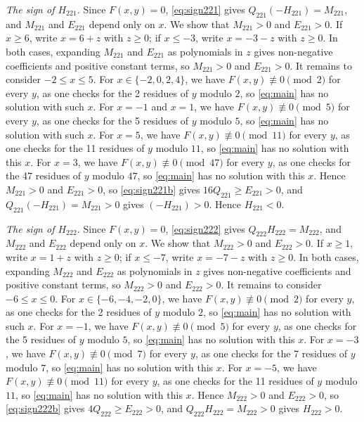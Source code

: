 \documentclass[11pt]{article}
\begin{document}
\emph{The sign of $H_{221}$.} Since $F(x,y)=0$, \eqref{eq:sign221} gives $Q_{221}(-H_{221})=M_{221}$, and $M_{221}$ and $E_{221}$ depend only on $x$. We show that $M_{221}>0$ and $E_{221}>0$. If $x\geq6$, write $x=6+z$ with $z\geq0$; if $x\leq-3$, write $x=-3-z$ with $z\geq0$. In both cases, expanding $M_{221}$ and $E_{221}$ as polynomials in $z$ gives non-negative coefficients and positive constant terms, so $M_{221}>0$ and $E_{221}>0$. It remains to consider $-2\leq x\leq5$. For $x\in\{-2,\allowbreak 0,\allowbreak 2,\allowbreak 4\}$, we have $F(x,y)\not\equiv0\pmod{2}$ for every $y$, as one checks for the 2 residues of $y$ modulo $2$, so \eqref{eq:main} has no solution with such $x$. For $x=-1$ and $x=1$, we have $F(x,y)\not\equiv0\pmod{5}$ for every $y$, as one checks for the 5 residues of $y$ modulo $5$, so \eqref{eq:main} has no solution with such $x$. For $x=5$, we have $F(x,y)\not\equiv0\pmod{11}$ for every $y$, as one checks for the 11 residues of $y$ modulo $11$, so \eqref{eq:main} has no solution with this $x$. For $x=3$, we have $F(x,y)\not\equiv0\pmod{47}$ for every $y$, as one checks for the 47 residues of $y$ modulo $47$, so \eqref{eq:main} has no solution with this $x$. Hence $M_{221}>0$ and $E_{221}>0$, so \eqref{eq:sign221b} gives $16Q_{221}\geq E_{221}>0$, and $Q_{221}(-H_{221})=M_{221}>0$ gives $(-H_{221})>0$. Hence $H_{221}<0$.

\emph{The sign of $H_{222}$.} Since $F(x,y)=0$, \eqref{eq:sign222} gives $Q_{222}H_{222}=M_{222}$, and $M_{222}$ and $E_{222}$ depend only on $x$. We show that $M_{222}>0$ and $E_{222}>0$. If $x\geq1$, write $x=1+z$ with $z\geq0$; if $x\leq-7$, write $x=-7-z$ with $z\geq0$. In both cases, expanding $M_{222}$ and $E_{222}$ as polynomials in $z$ gives non-negative coefficients and positive constant terms, so $M_{222}>0$ and $E_{222}>0$. It remains to consider $-6\leq x\leq0$. For $x\in\{-6,\allowbreak -4,\allowbreak -2,\allowbreak 0\}$, we have $F(x,y)\not\equiv0\pmod{2}$ for every $y$, as one checks for the 2 residues of $y$ modulo $2$, so \eqref{eq:main} has no solution with such $x$. For $x=-1$, we have $F(x,y)\not\equiv0\pmod{5}$ for every $y$, as one checks for the 5 residues of $y$ modulo $5$, so \eqref{eq:main} has no solution with this $x$. For $x=-3$, we have $F(x,y)\not\equiv0\pmod{7}$ for every $y$, as one checks for the 7 residues of $y$ modulo $7$, so \eqref{eq:main} has no solution with this $x$. For $x=-5$, we have $F(x,y)\not\equiv0\pmod{11}$ for every $y$, as one checks for the 11 residues of $y$ modulo $11$, so \eqref{eq:main} has no solution with this $x$. Hence $M_{222}>0$ and $E_{222}>0$, so \eqref{eq:sign222b} gives $4Q_{222}\geq E_{222}>0$, and $Q_{222}H_{222}=M_{222}>0$ gives $H_{222}>0$.
\end{document}
